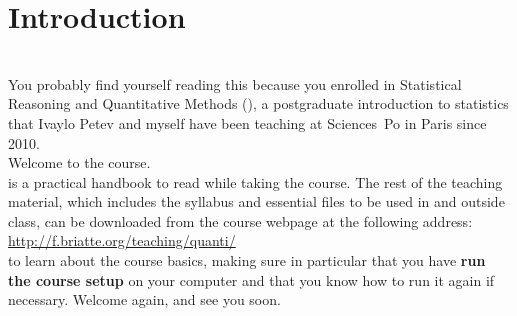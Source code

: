 %
%
\chapter{Introduction}%
	\label{ch:intro}
  \begin{mybox}%
    \\[1em]%
  	You probably find yourself reading this because you enrolled in Statistical Reasoning and Quantitative Methods (\SRQM), a postgraduate introduction to statistics that Ivaylo Petev and myself have been teaching at Sciences~Po in Paris since 2010.\\[1em]%
    Welcome to the course.\\[1em]%
     is a practical handbook to read while taking the course. The rest of the teaching material, which includes the syllabus and essential files to be used in and outside class, can be downloaded from the course webpage at the following address:\\[1em]%
      \url{http://f.briatte.org/teaching/quanti/}\\[1em]%
     to learn about the course basics, making sure in particular that you have \textbf{run the course setup} on your computer and that you know how to run it again if necessary. Welcome again, and see you soon.%
  \end{mybox}\\[4em]%
  \startcontents[chapters]%
	\newpage%

%
%
%
%
%
%
%
%
%
%

\stopcontents[chapters]

%
%
